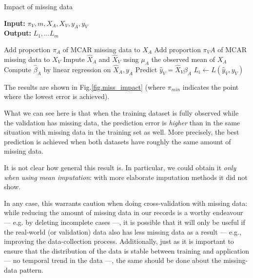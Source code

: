 \begin{algorithm}[H]
	\caption{Impact of missing data}
	\hspace*{\algorithmicindent} \textbf{Input:} $\pi_V, m, X_A, X_V, y_A,y_V$  \\
	\hspace*{\algorithmicindent} \textbf{Output:} $L_1, \ldots L_m$  \\
	\begin{algorithmic}[1]
			\State Add proportion $\pi_A$ of MCAR missing data to $X_A$
			\State Add proportion $\pi_VA$ of MCAR missing data to $X_V$
			\State Impute $\hat{X}_A$ and $\hat{X}_V$ using $\mu_A$ the observed mean of $X_A$
			\State Compute $\hat{\beta}_A$ by linear regression on $\hat{X}_A, y_A$
			\State Predict $\hat{y}_V = \hat{X}_V \hat{\beta}_A$
			\State $L_i \leftarrow L(\hat{y}_V, y_V)$
		\EndFor
	\end{algorithmic}
\end{algorithm}

The results are shown in Fig.\ref{fig.miss_impact} (where $\pi_{min}$ indicates the point where the lowest error is achieved).



What we can see here is that when the training dataset is fully observed while the validation has missing data, the prediction error is \emph{higher} than in the same situation with missing data in the training set as well. More precisely, the best prediction is achieved when both datasets have roughly the same amount of missing data.

It is not clear how general this result is. In particular, we could obtain it \emph{only when using mean imputation}: with more elaborate imputation methods it did not show. 

 In any case, this warrants caution when doing cross-validation with missing data: while reducing the amount of missing data in our records is a worthy endeavour --- e.g. by deleting incomplete cases ---, it is possible that it will only be useful if the real-world (or validation) data also has less missing data as a result --- e.g., improving the data-collection process. Additionally, just as it is important to ensure that the distribution of the data is stable between training and application --- no temporal trend in the data ---, the same should be done about the missing-data pattern.
